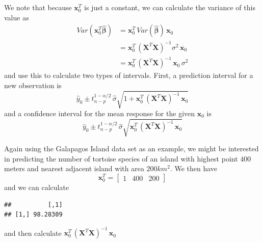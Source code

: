 \documentclass[]{book}
\newenvironment{Shaded}{\begin{snugshade}}{\end{snugshade}}
\newcommand{\KeywordTok}[1]{\textcolor[rgb]{0.13,0.29,0.53}{\textbf{{#1}}}}
\newcommand{\DecValTok}[1]{\textcolor[rgb]{0.00,0.00,0.81}{{#1}}}
\newcommand{\StringTok}[1]{\textcolor[rgb]{0.31,0.60,0.02}{{#1}}}
\newcommand{\NormalTok}[1]{{#1}}
\theoremstyle{definition}
\theoremstyle{definition}
\theoremstyle{remark}
\begin{document}
We note that because \(\boldsymbol{x}_{0}^{T}\) is just a constant, we
can calculate the variance of this value as \[ \begin{aligned}
Var\left(\boldsymbol{x}_{0}^{T}\hat{\boldsymbol{\beta}}\right)  
  &= \boldsymbol{x}_{0}^{T}\,Var\left(\hat{\boldsymbol{\beta}}\right)\,\boldsymbol{x}_{0} \\
    &=  \boldsymbol{x}_{0}^{T}\,\left(\boldsymbol{X}^{T}\boldsymbol{X}\right)^{-1}\sigma^{2}\,\boldsymbol{x}_{0} \\
    &=  \boldsymbol{x}_{0}^{T}\,\left(\boldsymbol{X}^{T}\boldsymbol{X}\right)^{-1}\,\boldsymbol{x}_{0}\,\sigma^{2}
\end{aligned}\] and use this to calculate two types of intervals. First,
a prediction interval for a new observation is
\[\hat{y}_{0}\pm t_{n-p}^{1-\alpha/2}\,\hat{\sigma}\sqrt{1+\boldsymbol{x}_{0}^{T}\,\left(\boldsymbol{X}^{T}\boldsymbol{X}\right)^{-1}\,\boldsymbol{x}_{0}}\]
and a confidence interval for the mean response for the given
\(\boldsymbol{x}_{0}\) is
\[\hat{y}_{0}\pm t_{n-p}^{1-\alpha/2}\,\hat{\sigma}\sqrt{\boldsymbol{x}_{0}^{T}\,\left(\boldsymbol{X}^{T}\boldsymbol{X}\right)^{-1}\,\boldsymbol{x}_{0}}\]

Again using the Galapagos Island data set as an example, we might be
interested in predicting the number of tortoise species of an island
with highest point \(400\) meters and nearest adjacent island with area
\(200 km^{2}\). We then have
\[\boldsymbol{x}_{0}^{T} = \left[\begin{array}{ccc}1  &  400  &  200\end{array}\right]\]
and we can calculate

\begin{Shaded}
\end{Shaded}

\begin{verbatim}
##          [,1]
## [1,] 98.28309
\end{verbatim}

and then calculate
\(\boldsymbol{x}_{0}^{T}\,\left(\boldsymbol{X}^{T}\boldsymbol{X}\right)^{-1}\,\boldsymbol{x}_{0}\)

\begin{Shaded}
\end{Shaded}
\end{document}
